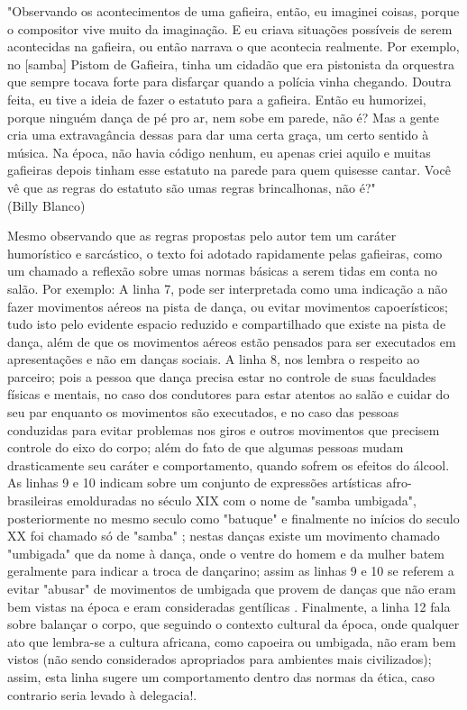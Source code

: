 \begin{tcolorbox}[colback=lowgray,colframe=lowgray]%
"Observando os acontecimentos de uma gafieira, então, eu imaginei
coisas, porque o compositor vive muito da imaginação. E eu criava situações 
possíveis de serem acontecidas na gafieira, ou então narrava o que
acontecia realmente. Por exemplo, no [samba] Pistom de Gafieira, tinha
um cidadão que era pistonista da orquestra que sempre tocava forte para
disfarçar quando a polícia vinha chegando. Doutra feita, eu tive a ideia
de fazer o estatuto para a gafieira. Então eu humorizei, porque ninguém
dança de pé pro ar, nem sobe em parede, não é? Mas a gente cria uma
extravagância dessas para dar uma certa graça, um certo sentido à música.
Na época, não havia código nenhum, eu apenas criei aquilo e muitas gafieiras 
depois tinham esse estatuto na parede para quem quisesse cantar.
Você vê que as regras do estatuto são umas regras brincalhonas, não é?" 
~\\
(Billy Blanco)
\end{tcolorbox}

Mesmo observando que as regras propostas pelo autor tem um caráter humorístico e sarcástico,
o texto foi adotado rapidamente pelas gafieiras, como um chamado a reflexão sobre umas
normas básicas a serem tidas em conta no salão. Por exemplo: 
A linha 7, pode ser interpretada como uma indicação a 
não fazer movimentos aéreos na pista de dança,
ou  evitar movimentos capoerísticos; tudo isto
pelo evidente espacio reduzido e compartilhado que existe na pista de dança, 
além de que os movimentos aéreos estão pensados para ser
executados em apresentações e não em danças sociais. 
A linha 8, nos lembra o respeito ao parceiro; pois a pessoa que dança precisa
estar no controle de suas faculdades físicas e mentais, 
no caso dos condutores para estar atentos ao salão e cuidar do seu par enquanto os movimentos são executados, 
e no caso das pessoas conduzidas para evitar problemas
nos giros e outros movimentos que precisem  controle do eixo do corpo; 
além do fato de que algumas pessoas mudam drasticamente seu 
caráter e comportamento, quando  sofrem os efeitos do álcool.
As linhas 9 e 10 indicam sobre um conjunto de expressões artísticas 
afro-brasileiras emolduradas no século XIX com o nome de "samba umbigada",
posteriormente no mesmo seculo como "batuque" e finalmente no inícios do seculo XX foi chamado só 
de "samba" \cite[pp. 47]{diniz2008almanaque} \cite[pp. 85]{sandroni2001feitico}; nestas danças existe
um movimento chamado "umbigada" \cite{da2015historia} que da nome à dança, onde o ventre do homem e da mulher batem geralmente para indicar
a troca de dançarino; assim as linhas 9 e 10 se referem a
 evitar "abusar" de movimentos de umbigada que provem de danças que não eram bem vistas na época e eram consideradas gentílicas \cite[pp. 85]{sandroni2001feitico}.
Finalmente,
a linha 12 fala sobre balançar o corpo, que seguindo o contexto cultural da 
época, onde qualquer ato que lembra-se a cultura africana, como capoeira ou umbigada, 
não eram bem vistos (não sendo considerados apropriados para ambientes mais civilizados); 
assim, esta linha sugere um comportamento dentro das normas da ética,
caso contrario seria levado à delegacia!.



